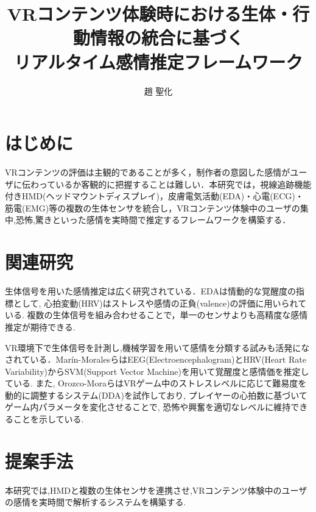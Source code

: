 \documentclass[paper=a4paper,fontsize=10pt,jafontscale=0.925,twocolumn]{jlreq}
\title{VRコンテンツ体験時における生体・行動情報の統合に基づく\\リアルタイム感情推定フレームワーク} %
\affiliation{人間システム工学科 井村研究室} %
\author{趙 聖化} %
\begin{document}
\maketitle


\section{はじめに}

VRコンテンツの評価は主観的であることが多く，制作者の意図した感情がユーザに伝わっているか客観的に把握することは難しい．本研究では，視線追跡機能付きHMD(ヘッドマウントディスプレイ)，皮膚電気活動(EDA)・心電(ECG)・筋電(EMG)等の複数の生体センサを統合し，VRコンテンツ体験中のユーザの集中,恐怖,驚きといった感情を実時間で推定するフレームワークを構築する．

\section{関連研究}

生体信号を用いた感情推定は広く研究されている．EDAは情動的な覚醒度の指標として, 心拍変動(HRV)はストレスや感情の正負(valence)の評価に用いられている. 複数の生体信号を組み合わせることで，単一のセンサよりも高精度な感情推定が期待できる\cite{Guixeres2020, Glancy2021}.

VR環境下で生体信号を計測し,機械学習を用いて感情を分類する試みも活発になされている．Marín-Moralesら\cite{Marin-Morales2018}はEEG(Electroencephalogram)とHRV(Heart Rate Variability)からSVM(Support Vector Machine)を用いて覚醒度と感情価を推定している. また, Orozco-Moraら\cite{Orozco-Mora2024}はVRゲーム中のストレスレベルに応じて難易度を動的に調整するシステム(DDA)を試作しており, プレイヤーの心拍数に基づいてゲーム内パラメータを変化させることで, 恐怖や興奮を適切なレベルに維持できることを示している.

\section{提案手法}

本研究では,HMDと複数の生体センサを連携させ,VRコンテンツ体験中のユーザの感情を実時間で解析するシステムを構築する.
\end{document}
